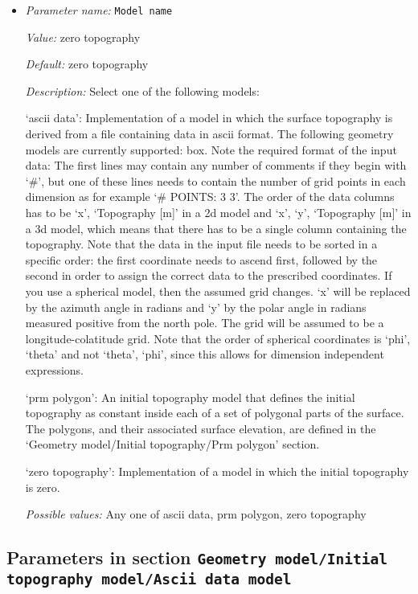 \begin{itemize}
\item {\it Parameter name:} {\tt Model name}
\label{parameters:Geometry model/Initial topography model/Model name}


{\it Value:} zero topography


{\it Default:} zero topography


{\it Description:} Select one of the following models:

`ascii data': Implementation of a model in which the surface topography is derived from a file containing data in ascii format. The following geometry models are currently supported: box. Note the required format of the input data: The first lines may contain any number of comments if they begin with `\#', but one of these lines needs to contain the number of grid points in each dimension as for example `\# POINTS: 3 3'. The order of the data columns has to be `x', `Topography [m]' in a 2d model and  `x', `y', `Topography [m]' in a 3d model, which means that there has to be a single column containing the topography. Note that the data in the input file needs to be sorted in a specific order: the first coordinate needs to ascend first, followed by the second in order to assign the correct data to the prescribed coordinates. If you use a spherical model, then the assumed grid changes. `x' will be replaced by the azimuth angle in radians  and `y' by the polar angle in radians measured positive from the north pole. The grid will be assumed to be a longitude-colatitude grid. Note that the order of spherical coordinates is `phi', `theta' and not `theta', `phi', since this allows for dimension independent expressions.

`prm polygon': An initial topography model that defines the initial topography as constant inside each of a set of polygonal parts of the surface. The polygons, and their associated surface elevation, are defined in the `Geometry model/Initial topography/Prm polygon' section.

`zero topography': Implementation of a model in which the initial topography is zero. 


{\it Possible values:} Any one of ascii data, prm polygon, zero topography
\end{itemize}



\subsection{Parameters in section \tt Geometry model/Initial topography model/Ascii data model}
\label{parameters:Geometry_20model/Initial_20topography_20model/Ascii_20data_20model}


